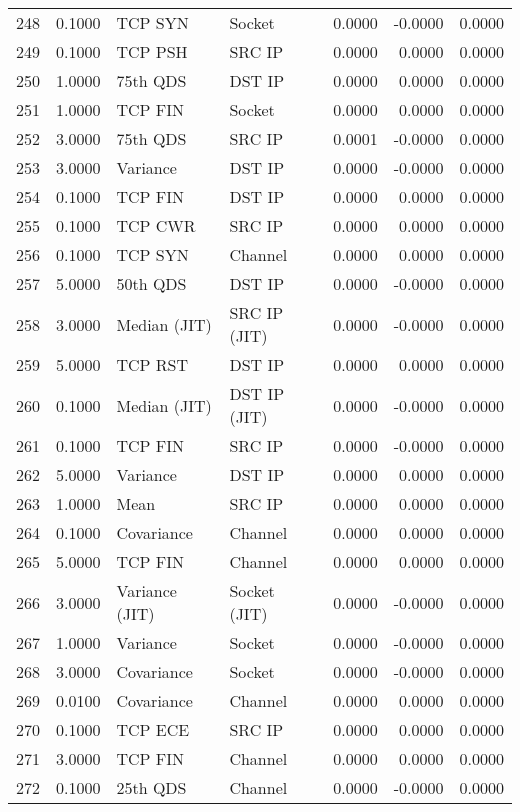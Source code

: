 \begin{longtable}{lrllrrr}
248 & 0.1000 & TCP SYN & Socket & 0.0000 & -0.0000 & 0.0000 \\
249 & 0.1000 & TCP PSH & SRC IP & 0.0000 & 0.0000 & 0.0000 \\
250 & 1.0000 & 75th QDS & DST IP & 0.0000 & 0.0000 & 0.0000 \\
251 & 1.0000 & TCP FIN & Socket & 0.0000 & 0.0000 & 0.0000 \\
252 & 3.0000 & 75th QDS & SRC IP & 0.0001 & -0.0000 & 0.0000 \\
253 & 3.0000 & Variance & DST IP & 0.0000 & -0.0000 & 0.0000 \\
254 & 0.1000 & TCP FIN & DST IP & 0.0000 & 0.0000 & 0.0000 \\
255 & 0.1000 & TCP CWR & SRC IP & 0.0000 & 0.0000 & 0.0000 \\
256 & 0.1000 & TCP SYN & Channel & 0.0000 & 0.0000 & 0.0000 \\
257 & 5.0000 & 50th QDS & DST IP & 0.0000 & -0.0000 & 0.0000 \\
258 & 3.0000 & Median (JIT) & SRC IP (JIT) & 0.0000 & -0.0000 & 0.0000 \\
259 & 5.0000 & TCP RST & DST IP & 0.0000 & 0.0000 & 0.0000 \\
260 & 0.1000 & Median (JIT) & DST IP (JIT) & 0.0000 & -0.0000 & 0.0000 \\
261 & 0.1000 & TCP FIN & SRC IP & 0.0000 & -0.0000 & 0.0000 \\
262 & 5.0000 & Variance & DST IP & 0.0000 & 0.0000 & 0.0000 \\
263 & 1.0000 & Mean & SRC IP & 0.0000 & 0.0000 & 0.0000 \\
264 & 0.1000 & Covariance & Channel & 0.0000 & 0.0000 & 0.0000 \\
265 & 5.0000 & TCP FIN & Channel & 0.0000 & 0.0000 & 0.0000 \\
266 & 3.0000 & Variance (JIT) & Socket (JIT) & 0.0000 & -0.0000 & 0.0000 \\
267 & 1.0000 & Variance & Socket & 0.0000 & -0.0000 & 0.0000 \\
268 & 3.0000 & Covariance & Socket & 0.0000 & -0.0000 & 0.0000 \\
269 & 0.0100 & Covariance & Channel & 0.0000 & 0.0000 & 0.0000 \\
270 & 0.1000 & TCP ECE & SRC IP & 0.0000 & 0.0000 & 0.0000 \\
271 & 3.0000 & TCP FIN & Channel & 0.0000 & 0.0000 & 0.0000 \\
272 & 0.1000 & 25th QDS & Channel & 0.0000 & -0.0000 & 0.0000 \\

\end{longtable}

